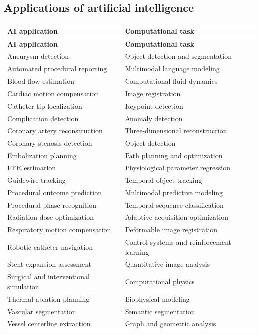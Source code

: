 \subsection{Applications of artificial intelligence}
\begin{longtable}{@{}p{}p{}@{}}
\toprule
\textbf{AI application} & \textbf{Computational task} \\
\midrule
\endfirsthead
\toprule
\textbf{AI application} & \textbf{Computational task} \\
\midrule
\endhead
Aneurysm detection & Object detection and segmentation \\
Automated procedural reporting & Multimodal language modeling \\
Blood flow estimation & Computational fluid dynamics \\
Cardiac motion compensation & Image registration \\
Catheter tip localization & Keypoint detection \\
Complication detection & Anomaly detection \\
Coronary artery reconstruction & Three-dimensional reconstruction \\
Coronary stenosis detection & Object detection \\
Embolization planning & Path planning and optimization \\
FFR estimation & Physiological parameter regression \\
Guidewire tracking & Temporal object tracking \\
Procedural outcome prediction & Multimodal predictive modeling \\
Procedural phase recognition & Temporal sequence classification \\
Radiation dose optimization & Adaptive acquisition optimization \\
Respiratory motion compensation & Deformable image registration \\
Robotic catheter navigation & Control systems and reinforcement learning \\
Stent expansion assessment & Quantitative image analysis \\
Surgical and interventional simulation & Computational physics \\
Thermal ablation planning & Biophysical modeling \\
Vascular segmentation & Semantic segmentation \\
Vessel centerline extraction & Graph and geometric analysis \\
\bottomrule
\end{longtable}

